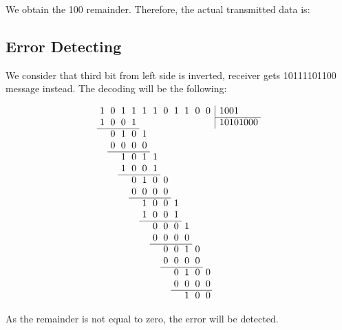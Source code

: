 \documentclass[12pt]{article}
\begin{document}
        We obtain the 100 remainder.
        Therefore, the actual transmitted data is:
        \begin{center}
        \end{center}

        \subsection{Error Detecting}
        We consider that third bit from left side is inverted, receiver gets 10111101100 message instead.
        The decoding will be the following:

        \[\arraycolsep=0.3em
        \begin{array}{rrrrrrrrrrr@{\,}r|l}
            1 & 0 & 1 & 1 & 1 & 1 & 0 & 1 & 1 & 0 & 0 & & \,1001 \\
            \cline{13-10}
            1 & 0 & 0 & 1 &   &   &   &   &   &   &   & & \,10101000     \\
            \cline{1-4}
            & 0 & 1 & 0 & 1 \\
            & 0 & 0 & 0 & 0 \\
            \cline{2-5}
            & & 1 & 0 & 1 & 1 \\
            & & 1 & 0 & 0 & 1 \\
            \cline{3-6}
            & & & 0 & 1 & 0 & 0 \\
            & & & 0 & 0 & 0 & 0 \\
            \cline{4-7}
            & & & & 1 & 0 & 0 & 1 \\
            & & & & 1 & 0 & 0 & 1 \\
            \cline{5-8}
            & & & & & 0 & 0 & 0 & 1 \\
            & & & & & 0 & 0 & 0 & 0 \\
            \cline{6-9}
            & & & & & & 0 & 0 & 1 & 0 \\
            & & & & & & 0 & 0 & 0 & 0 \\
            \cline{7-10}
            & & & & & & & 0 & 1 & 0 & 0 \\
            & & & & & & & 0 & 0 & 0 & 0 \\
            \cline{8-11}
            & & & & & & & & 1 & 0 & 0
        \end{array}
        \]

        As the remainder is not equal to zero, the error will be detected.
    \newpage
\end{document}
